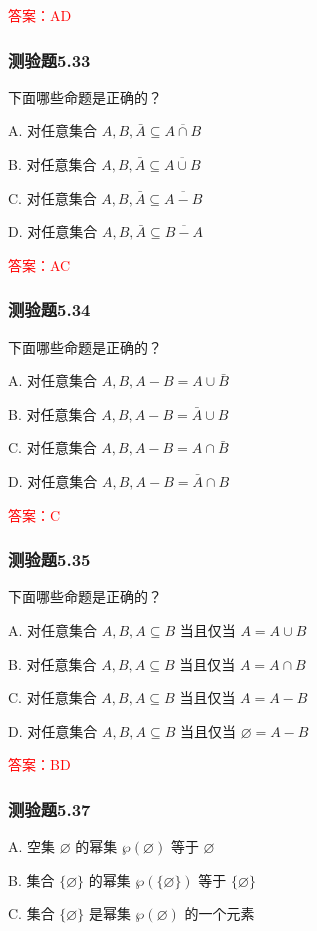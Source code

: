 \documentclass[UTF8, heading=true]{ctexart}
\begin{document}
\textcolor{red}{答案：AD}

\subsubsection{测验题5.33}

下面哪些命题是正确的？

A. 对任意集合 $A, B, \bar{A} \subseteq \overline{A \cap B}$

B. 对任意集合 $A, B, \bar{A} \subseteq \overline{A \cup B}$

C. 对任意集合 $A, B, \bar{A} \subseteq \overline{A-B}$

D. 对任意集合 $A, B, \bar{A} \subseteq \overline{B-A}$

\textcolor{red}{答案：AC}

\subsubsection{测验题5.34}
下面哪些命题是正确的？

A. 
对任意集合 $A, B, A-B=A \cup \bar{B}$

B. 对任意集合 $A, B, A-B=\bar{A} \cup B$

C. 对任意集合 $A, B, A-B=A \cap \bar{B}$

D. 对任意集合 $A, B, A-B=\bar{A} \cap B$

\textcolor{red}{答案：C}


\subsubsection{测验题5.35}
下面哪些命题是正确的？

A. 对任意集合 $A, B, A \subseteq B$ 当且仅当 $A=A \cup B$

B. 对任意集合 $A, B, A \subseteq B$ 当且仅当 $A=A \cap B$

C. 对任意集合 $A, B, A \subseteq B$ 当且仅当 $A=A-B$

D. 对任意集合 $A, B, A \subseteq B$ 当且仅当 $\varnothing=A-B$

\textcolor{red}{答案：BD}

\subsubsection{测验题5.37}
A. 
空集 $\varnothing$ 的幂集 $\wp(\varnothing)$ 等于 $\varnothing$

B. 
集合 $\{\varnothing\}$ 的幂集 $\wp(\{\varnothing\})$ 等于 $\{\varnothing\}$

C. 
集合 $\{\varnothing\}$ 是幂集 $\wp(\varnothing)$ 的一个元素
\end{document}

